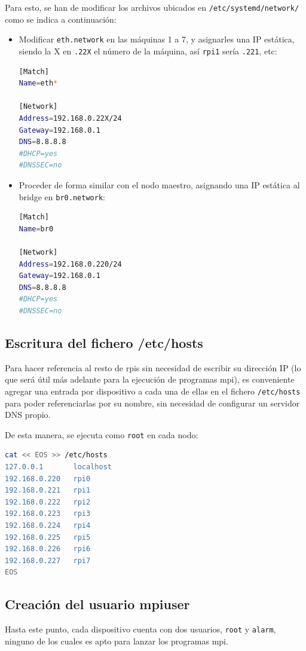 Para esto, se han de modificar los archivos ubicados en \texttt{/etc/systemd/network/} como se indica a continuación:

\begin{itemize}
    \item Modificar \texttt{eth.network} en las máquinas 1 a 7, y asignarles una IP estática, siendo la X en \texttt{.22X} el número de la máquina, así \texttt{rpi1} sería \texttt{.221}, etc:
\begin{lstlisting}[language=bash]
[Match]
Name=eth*

[Network]
Address=192.168.0.22X/24
Gateway=192.168.0.1
DNS=8.8.8.8
#DHCP=yes
#DNSSEC=no
\end{lstlisting}
    \item Proceder de forma similar con el nodo maestro, asignando una IP estática al bridge en \texttt{br0.network}:
\begin{lstlisting}[language=bash]
[Match]
Name=br0

[Network]
Address=192.168.0.220/24
Gateway=192.168.0.1
DNS=8.8.8.8
#DHCP=yes
#DNSSEC=no
\end{lstlisting}
\end{itemize}

\subsection{Escritura del fichero /etc/hosts}
Para hacer referencia al resto de \acrshort{rpi}s sin necesidad de escribir su dirección IP (lo que será útil más adelante para la ejecución de programas \acrshort{mpi}), es conveniente agregar una entrada por dispositivo a cada una de ellas en el fichero \texttt{/etc/hosts} para poder referenciarlas por su nombre, sin necesidad de configurar un servidor DNS propio.

De esta manera, se ejecuta como \texttt{root} en cada nodo:
\begin{lstlisting}[language=bash]
cat << EOS >> /etc/hosts
127.0.0.1       localhost
192.168.0.220   rpi0
192.168.0.221   rpi1
192.168.0.222   rpi2
192.168.0.223   rpi3
192.168.0.224   rpi4
192.168.0.225   rpi5
192.168.0.226   rpi6
192.168.0.227   rpi7
EOS
\end{lstlisting}

\subsection{Creación del usuario mpiuser}
Hasta este punto, cada dispositivo cuenta con dos usuarios, \texttt{root} y \texttt{alarm}, ninguno de los cuales es apto para lanzar los programas \acrshort{mpi}.

